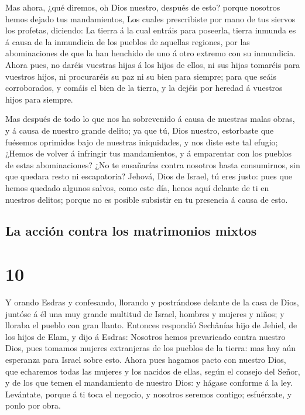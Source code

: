  Mas ahora, ¿qué diremos, oh Dios nuestro, después de esto?
porque nosotros hemos dejado tus mandamientos,  Los cuales
prescribiste por mano de tus siervos los profetas, diciendo: La tierra á
la cual entráis para poseerla, tierra inmunda es á causa de la
inmundicia de los pueblos de aquellas regiones, por las abominaciones de
que la han henchido de uno á otro extremo con su inmundicia.
 Ahora pues, no daréis vuestras hijas á los hijos de ellos,
ni sus hijas tomaréis para vuestros hijos, ni procuraréis su paz ni su
bien para siempre; para que seáis corroborados, y comáis el bien de la
tierra, y la dejéis por heredad á vuestros hijos para siempre.

 Mas después de todo lo que nos ha sobrevenido á causa de
nuestras malas obras, y á causa de nuestro grande delito; ya que tú,
Dios nuestro, estorbaste que fuésemos oprimidos bajo de nuestras
iniquidades, y nos diste este tal efugio;  ¿Hemos de volver
á infringir tus mandamientos, y á emparentar con los pueblos de estas
abominaciones? ¿No te ensañarías contra nosotros hasta consumirnos, sin
que quedara resto ni escapatoria?  Jehová, Dios de Israel,
tú eres justo: pues que hemos quedado algunos salvos, como este día,
henos aquí delante de ti en nuestros delitos; porque no es posible
subsistir en tu presencia á causa de esto.

\hypertarget{la-acciuxf3n-contra-los-matrimonios-mixtos}{%
\subsection{La acción contra los matrimonios
mixtos}\label{la-acciuxf3n-contra-los-matrimonios-mixtos}}

\hypertarget{section-9}{%
\section{10}\label{section-9}}

 Y orando Esdras y confesando, llorando y postrándose
delante de la casa de Dios, juntóse á él una muy grande multitud de
Israel, hombres y mujeres y niños; y lloraba el pueblo con gran llanto.
 Entonces respondió Sechânías hijo de Jehiel, de los hijos
de Elam, y dijo á Esdras: Nosotros hemos prevaricado contra nuestro
Dios, pues tomamos mujeres extranjeras de los pueblos de la tierra: mas
hay aún esperanza para Israel sobre esto.  Ahora pues
hagamos pacto con nuestro Dios, que echaremos todas las mujeres y los
nacidos de ellas, según el consejo del Señor, y de los que temen el
mandamiento de nuestro Dios: y hágase conforme á la ley. 
Levántate, porque á ti toca el negocio, y nosotros seremos contigo;
esfuérzate, y ponlo por obra.

